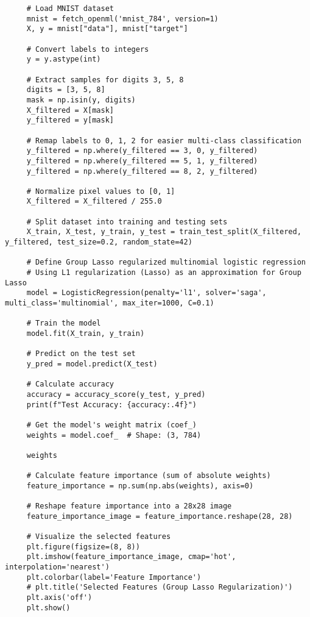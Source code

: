 \documentclass[letterpaper]{article}
\begin{document}
\begin{lstlisting}
     # Load MNIST dataset
     mnist = fetch_openml('mnist_784', version=1)
     X, y = mnist["data"], mnist["target"]
     
     # Convert labels to integers
     y = y.astype(int)
     
     # Extract samples for digits 3, 5, 8
     digits = [3, 5, 8]
     mask = np.isin(y, digits)
     X_filtered = X[mask]
     y_filtered = y[mask]
     
     # Remap labels to 0, 1, 2 for easier multi-class classification
     y_filtered = np.where(y_filtered == 3, 0, y_filtered)
     y_filtered = np.where(y_filtered == 5, 1, y_filtered)
     y_filtered = np.where(y_filtered == 8, 2, y_filtered)
     
     # Normalize pixel values to [0, 1]
     X_filtered = X_filtered / 255.0
     
     # Split dataset into training and testing sets
     X_train, X_test, y_train, y_test = train_test_split(X_filtered, y_filtered, test_size=0.2, random_state=42)
     
     # Define Group Lasso regularized multinomial logistic regression
     # Using L1 regularization (Lasso) as an approximation for Group Lasso
     model = LogisticRegression(penalty='l1', solver='saga', multi_class='multinomial', max_iter=1000, C=0.1)
     
     # Train the model
     model.fit(X_train, y_train)
     
     # Predict on the test set
     y_pred = model.predict(X_test)
     
     # Calculate accuracy
     accuracy = accuracy_score(y_test, y_pred)
     print(f"Test Accuracy: {accuracy:.4f}")
     
     # Get the model's weight matrix (coef_)
     weights = model.coef_  # Shape: (3, 784)
     
     weights
     
     # Calculate feature importance (sum of absolute weights)
     feature_importance = np.sum(np.abs(weights), axis=0)
     
     # Reshape feature importance into a 28x28 image
     feature_importance_image = feature_importance.reshape(28, 28)
     
     # Visualize the selected features
     plt.figure(figsize=(8, 8))
     plt.imshow(feature_importance_image, cmap='hot', interpolation='nearest')
     plt.colorbar(label='Feature Importance')
     # plt.title('Selected Features (Group Lasso Regularization)')
     plt.axis('off')
     plt.show()
\end{lstlisting}
	
\end{document}

